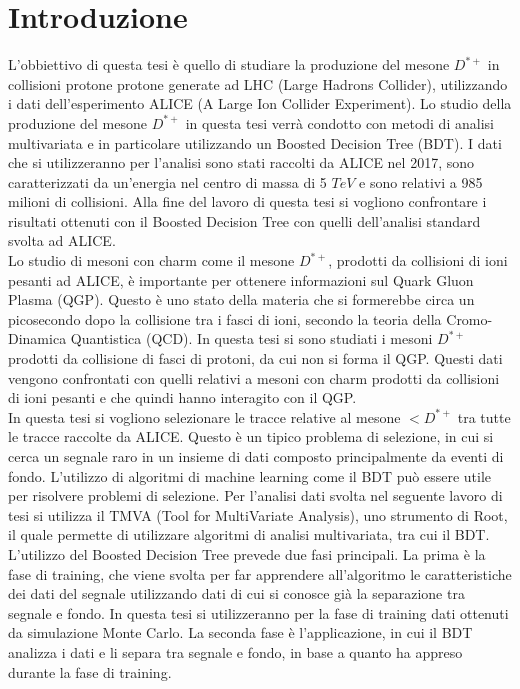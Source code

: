 \chapter{Introduzione}

L'obbiettivo di questa tesi è quello di studiare la produzione del mesone $D^{*+}$ in collisioni protone protone generate ad LHC (Large Hadrons Collider), utilizzando i dati dell'esperimento ALICE (A Large Ion Collider Experiment). Lo studio della produzione del mesone $D^{*+}$ in questa tesi verrà condotto con metodi di analisi multivariata e in particolare utilizzando un Boosted Decision Tree (BDT). I dati che si utilizzeranno per l'analisi sono stati raccolti da ALICE nel 2017, sono caratterizzati da un'energia nel centro di massa di 5 $TeV$ e sono relativi a 985 milioni di collisioni. Alla fine del lavoro di questa tesi si vogliono confrontare i risultati ottenuti con il Boosted Decision Tree con quelli dell'analisi standard svolta ad ALICE.
\\Lo studio di mesoni con charm come il mesone $D^{*+}$, prodotti da collisioni di ioni pesanti ad ALICE, è importante per ottenere informazioni sul Quark Gluon Plasma (QGP). Questo è uno stato della materia che si formerebbe circa un picosecondo dopo la collisione tra i fasci di ioni, secondo la teoria della Cromo-Dinamica Quantistica (QCD).
In questa tesi si sono studiati i mesoni $D^{*+}$ prodotti da collisione di fasci di protoni, da cui non si forma il QGP. Questi dati vengono confrontati con quelli relativi a mesoni con charm prodotti da collisioni di ioni pesanti e che quindi hanno interagito con il QGP.
\\In questa tesi si vogliono selezionare le tracce relative al mesone $<D^{*+}$ tra tutte le tracce raccolte da ALICE. Questo è un tipico problema di selezione, in cui si cerca un segnale raro in un insieme di dati composto principalmente da eventi di fondo. L'utilizzo di algoritmi di machine learning come il BDT può essere utile per risolvere problemi di selezione. Per l'analisi dati svolta nel seguente lavoro di tesi si utilizza il TMVA (Tool for MultiVariate Analysis), uno strumento di Root, il quale permette di utilizzare algoritmi di analisi multivariata, tra cui il BDT. L'utilizzo del Boosted Decision Tree prevede due fasi principali. La prima è la fase di training, che viene svolta per far apprendere all'algoritmo le caratteristiche dei dati del segnale utilizzando dati di cui si conosce già la separazione tra segnale e fondo. In questa tesi si utilizzeranno per la fase di training dati ottenuti da simulazione Monte Carlo. La seconda fase è l'applicazione, in cui il BDT analizza i dati e li separa tra segnale e fondo, in base a quanto ha appreso durante la fase di training.
